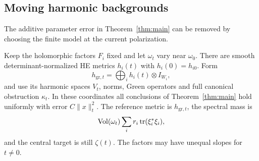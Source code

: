 \subsection{Moving harmonic backgrounds}\label{subsec:moving}
The additive parameter error in Theorem~\ref{thm:main} can be
removed by choosing the finite model at the current polarization.

\begin{proposition}\label{prop:moving}
Keep the holomorphic factors $F_i$ fixed and let $\omega_t$ vary
near $\omega_0$. There are smooth determinant-normalized HE metrics
$h_i(t)$ with $h_i(0)=h_{i0}$. Form
\[
 h_{\mathrm{gr},t}=\bigoplus_i h_i(t)\otimes I_{W_i},
\]
and use its harmonic spaces $V_t$, norms, Green operators and full
canonical obstruction $\kappa_t$. In these coordinates all
conclusions of Theorem~\ref{thm:main} hold uniformly with error
$C\|x\|_t^2$. The reference metric is $h_{\mathrm{gr},t}$,
the spectral mass is
\[
 \operatorname{Vol}(\omega_t)\sum_i r_i\operatorname{tr}(\xi_i^*\xi_i),
\]
and the central target is still $\zeta(t)$.
The factors may have unequal slopes for $t\ne0$.
\end{proposition}

